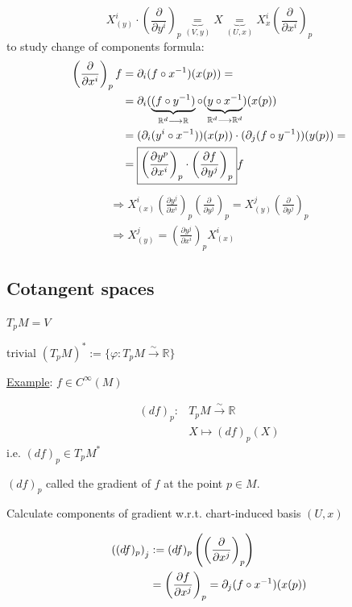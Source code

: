 \[
X^i_{(y)}\cdot \left( \frac{ \partial }{ \partial y^i} \right)_p \underbrace{=}_{(V,y)} X \underbrace{=}_{ (U,x) } X^i_{x} \left( \frac{ \partial }{ \partial x^i} \right)_p
\]
to study change of components formula:
\[
\begin{aligned}
  \left( \frac{ \partial }{ \partial x^i} \right)_p f & = \partial_i(f\circ x^{-1} )(x(p)) =  \\
  & = \partial_i (\underbrace{ (f\circ y^{-1}) }_{\mathbb{R}^d \longrightarrow \mathbb{R} } \circ (\underbrace{ y\circ x^{-1}}_{\mathbb{R}^d \longrightarrow \mathbb{R}^d} )(x(p)) \\
  & = (\partial_i (y^i\circ x^{-1} ) )(x(p)) \cdot (\partial_j (f\circ y^{-1}) )(y(p)) = \\
  & = \boxed{ \left( \frac{ \partial y^p}{ \partial x^i} \right)_p \cdot \left( \frac{ \partial f}{ \partial y^j} \right)_p  } f
\end{aligned}
\]
\[
\begin{gathered}
  \Longrightarrow X^i_{(x)} \left( \frac{ \partial y^j}{ \partial x^i} \right)_p \left( \frac{ \partial }{ \partial y^j} \right)_p = X^j_{(y)}\left( \frac{ \partial }{ \partial y^j} \right)_p \\
  \Longrightarrow \boxed{ X^j_{(y)} = \left( \frac{ \partial y^j}{ \partial x^i} \right)_pX^i_{(x)} }
\end{gathered}
\]

\subsection{Cotangent spaces }

$T_pM = V$

trivial $(T_pM)^* := \lbrace \varphi : T_pM \xrightarrow{\sim} \mathbb{R} \rbrace$

\underline{Example}: $f\in C^{\infty}(M)$ 

\[
\begin{aligned}
  (df)_p : & T_p M \xrightarrow{ \sim } \mathbb{R} \\ 
  & X \mapsto (df)_p(X)
\end{aligned}
\]
i.e. $\boxed{ (df)_p \in T_pM^* } $

$(df)_p$ called the gradient of $f$ at the point $p \in M$.  

Calculate components of gradient w.r.t. chart-induced basis $(U,x)$  

\[
\begin{aligned}
  \left( (df)_p \right)_j & := (df)_p\left( \left( \frac{ \partial }{ \partial x^j} \right)_p \right) \\
  & = \left( \frac{ \partial f}{ \partial x^j } \right)_p = \partial_j (f\circ x^{-1} )(x(p))
\end{aligned}
\]

